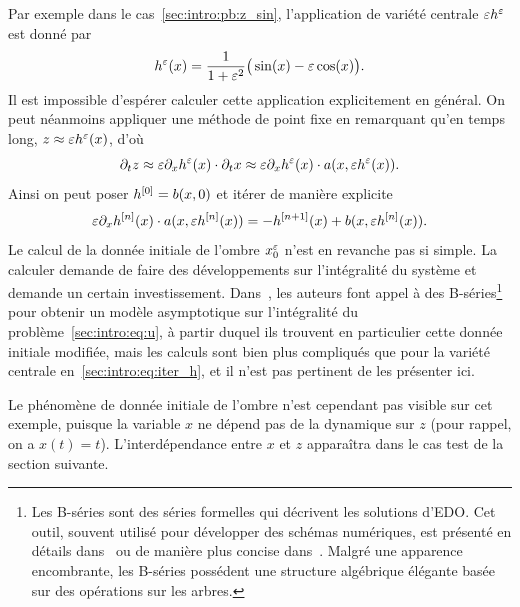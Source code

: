 Par exemple dans le cas~\eqref{sec:intro:pb:z_sin}, l'application de variété centrale $\varepsilon h^\varepsilon$ est donné par 
\begin{equation} \label{sec:intro:eq:h_sin}
    h^\varepsilon(x) 
    = \frac{1}{1 + \varepsilon^2} \big( \sin(x) - \varepsilon \cos(x) \big) .
\end{equation}
Il est impossible d'espérer calculer cette application explicitement en général. On peut néanmoins appliquer une méthode de point fixe en remarquant qu'en temps long, $z \approx \varepsilon h^\varepsilon(x)$, d'où 
\begin{equation*}
    \partial_t z \approx \varepsilon \partial_x h^\varepsilon(x) \cdot \partial_t x
    \approx \varepsilon \partial_x h^\varepsilon(x) \cdot a(x, \varepsilon h^\varepsilon(x)) . 
\end{equation*} Ainsi on peut poser $h^{[0]} = b(x,0)$ et itérer de manière explicite
\begin{equation} \label{sec:intro:eq:iter_h}
    \varepsilon \partial_x h^{[n]}(x) \cdot a(x, \varepsilon h^{[n]} (x)) 
    = - h^{[n+1]}(x) + b(x, \varepsilon h^{[n]} (x)) .
\end{equation}
Le calcul de la donnée initiale de l'ombre $x^\varepsilon_0$ n'est en revanche pas si simple. La calculer demande de faire des développements sur l'intégralité du système et demande un certain investissement. Dans~\cite{castella.2016.formal}, les auteurs font appel à des B-séries\footnote{
    Les B-séries sont des séries formelles qui décrivent les solutions d'EDO. Cet outil, souvent utilisé pour développer des schémas numériques, est présenté en détails dans~\cite[Chap.~III]{hairer.2006.geometric} ou de manière plus concise dans~\cite{chartier.2010.algebraic}. Malgré une apparence encombrante, les B-séries possédent une structure algébrique élégante basée sur des opérations sur les arbres.
} pour obtenir un modèle asymptotique sur l'intégralité du problème~\eqref{sec:intro:eq:u}, à partir duquel ils trouvent en particulier cette donnée initiale modifiée, mais les calculs sont bien plus compliqués que pour la variété centrale en~\eqref{sec:intro:eq:iter_h}, et il n'est pas pertinent de les présenter ici.

\begin{FRremark*}
    Le phénomène de donnée initiale de l'ombre n'est cependant pas visible sur cet exemple, puisque la variable $x$ ne dépend pas de la dynamique sur $z$ (pour rappel, on a $x(t) = t$). L'interdépendance entre $x$ et $z$ apparaîtra dans le cas test de la section suivante.
\end{FRremark*}

